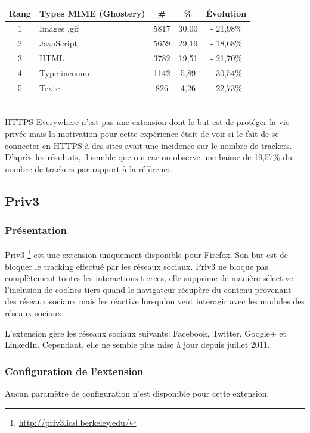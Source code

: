 \begin{tabular}{ c | p{5cm} | c | c | c | }
   Rang & Types MIME (Ghostery) & \# & \% & Évolution\\
   \hline
   \hline
   1 & Images .gif & 5817 & 30,00 & - 21,98\% \\
   2 & JavaScript & 5659 & 29,19 & - 18,68\% \\
   3 & HTML & 3782 & 19,51 & - 21,70\% \\
   4 & Type inconnu & 1142 & 5,89 & - 30,54\% \\
   5 & Texte & 826 & 4,26 & - 22,73\% \\
   \hline
\end{tabular}
\\[.3cm]

HTTPS Everywhere n'est pas une extension dont le but est de protéger la vie privée mais la motivation pour cette expérience était de voir si le fait de se connecter en HTTPS à des sites avait une incidence sur le nombre de trackers. D'après les résultats, il semble que oui car on observe une baisse de 19,57\% du nombre de trackers par rapport à la référence.


\subsection{Priv3}
\subsubsection{Présentation}
Priv3 \footnote{\url{http://priv3.icsi.berkeley.edu/}} est une extension uniquement disponible pour Firefox. Son but est de bloquer le tracking effectué par les réseaux sociaux. Priv3 ne bloque pas complètement toutes les interactions tierces, elle supprime de manière sélective l'inclusion de cookies tiers quand le navigateur récupère du contenu provenant des réseaux sociaux mais les réactive lorsqu'on veut interagir avec les modules des réseaux sociaux.
\newline

L'extension gère les réseaux sociaux suivants: Facebook, Twitter, Google+ et LinkedIn. Cependant, elle ne semble plus mise à jour depuis juillet 2011.

\subsubsection{Configuration de l'extension}
Aucun paramètre de configuration n'est disponible pour cette extension.

